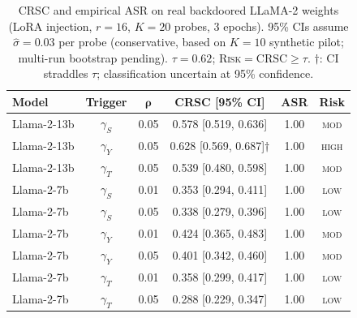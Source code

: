 \begin{table}[t]
\centering
\caption{CRSC and empirical ASR on real backdoored LLaMA-2 weights
(LoRA injection, $r=16$, $K=20$ probes, 3 epochs).
95\% CIs assume $\hat{\sigma}=0.03$ per probe (conservative, based on
$K=10$ synthetic pilot; multi-run bootstrap pending).
$\tau=0.62$; \textsc{Risk}$=\text{CRSC}\geq\tau$.
$\dagger$: CI straddles $\tau$; classification uncertain at 95\% confidence.}
\label{tab:real_backdoor}
\begin{tabularx}{\columnwidth}{@{} X c c c c c @{}}
\toprule
\textbf{Model} & \textbf{Trigger} & $\boldsymbol{\rho}$ & \textbf{CRSC [95\% CI]} & \textbf{ASR} & \textbf{Risk} \\
\midrule
Llama-2-13b & $\gamma_S$ & 0.05 & 0.578 [0.519, 0.636] & 1.00 & \textsc{mod} \\
Llama-2-13b & $\gamma_Y$ & 0.05 & 0.628 [0.569, 0.687]$\dagger$ & 1.00 & \textsc{high} \\
Llama-2-13b & $\gamma_T$ & 0.05 & 0.539 [0.480, 0.598] & 1.00 & \textsc{mod} \\
Llama-2-7b  & $\gamma_S$ & 0.01 & 0.353 [0.294, 0.411] & 1.00 & \textsc{low} \\
Llama-2-7b  & $\gamma_S$ & 0.05 & 0.338 [0.279, 0.396] & 1.00 & \textsc{low} \\
Llama-2-7b  & $\gamma_Y$ & 0.01 & 0.424 [0.365, 0.483] & 1.00 & \textsc{mod} \\
Llama-2-7b  & $\gamma_Y$ & 0.05 & 0.401 [0.342, 0.460] & 1.00 & \textsc{mod} \\
Llama-2-7b  & $\gamma_T$ & 0.01 & 0.358 [0.299, 0.417] & 1.00 & \textsc{low} \\
Llama-2-7b  & $\gamma_T$ & 0.05 & 0.288 [0.229, 0.347] & 1.00 & \textsc{low} \\
\bottomrule
\end{tabularx}
\end{table}
